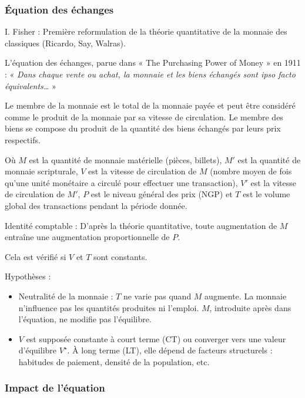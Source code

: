 \documentclass[a4paper, 12pt]{report}
\begin{document}
\subsubsection{Équation des échanges}
	
I. Fisher : Première reformulation de la théorie quantitative de la monnaie des classiques (Ricardo, Say, Walras).  

L'équation des échanges, parue dans « The Purchasing Power of Money » en 1911 :  
« \textit{Dans chaque vente ou achat, la monnaie et les biens échangés sont ipso facto équivalents… }»  
\begin{center}
	Le membre de la monnaie est le total de la monnaie payée et peut être considéré comme le produit de la monnaie par sa vitesse de circulation. Le membre des biens se compose du produit de la quantité des biens échangés par leurs prix respectifs.
\end{center}  

Où \( M \) est la quantité de monnaie matérielle (pièces, billets), \( M' \) est la quantité de monnaie scripturale, \( V \) est la vitesse de circulation de \( M \) (nombre moyen de fois qu'une unité monétaire a circulé pour effectuer une transaction), \( V' \) est la vitesse de circulation de \( M' \), \( P \) est le niveau général des prix (NGP) et \( T \) est le volume global des transactions pendant la période donnée.  

Identité comptable : D'après la théorie quantitative, toute augmentation de \( M \) entraîne une augmentation proportionnelle de \( P \).  

Cela est vérifié si \( V \) et \( T \) sont constants.  

Hypothèses :  
\begin{itemize}
	\item Neutralité de la monnaie : \( T \) ne varie pas quand \( M \) augmente. La monnaie n'influence pas les quantités produites ni l'emploi. \( M \), introduite après dans l'équation, ne modifie pas l'équilibre.
	\item \( V \) est supposée constante à court terme (CT) ou converger vers une valeur d'équilibre \( V^\star \). À long terme (LT), elle dépend de facteurs structurels : habitudes de paiement, densité de la population, etc.
\end{itemize}
	
\subsubsection{Impact de l’équation}
\end{document}
